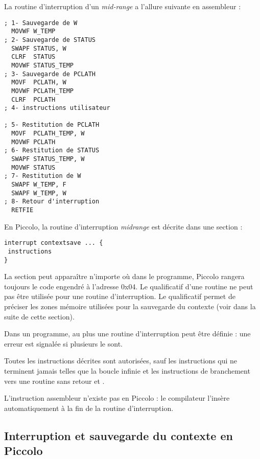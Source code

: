 La routine d'interruption d'un \emph{mid-range} a l'allure suivante en assembleur :

\begin{lstlisting}[language=assembleur]
; 1- Sauvegarde de W
  MOVWF W_TEMP 
; 2- Sauvegarde de STATUS
  SWAPF STATUS, W
  CLRF  STATUS
  MOVWF STATUS_TEMP 
; 3- Sauvegarde de PCLATH
  MOVF  PCLATH, W
  MOVWF PCLATH_TEMP 
  CLRF  PCLATH
; 4- instructions utilisateur

; 5- Restitution de PCLATH
  MOVF  PCLATH_TEMP, W
  MOVWF PCLATH 
; 6- Restitution de STATUS
  SWAPF STATUS_TEMP, W
  MOVWF STATUS
; 7- Restitution de W
  SWAPF W_TEMP, F
  SWAPF W_TEMP, W
; 8- Retour d'interruption
  RETFIE
\end{lstlisting}








En Piccolo, la routine d’interruption \emph{midrange} est décrite dans une section  :

\begin{lstlisting}[language=piccolo]
interrupt contextsave ... {
 instructions
}
\end{lstlisting}

La section  peut apparaître n’importe où dans le programme, Piccolo rangera toujours le code engendré à l’adresse 0x04. Le qualificatif  d’une routine ne peut pas être utilisée pour une routine d’interruption. Le qualificatif  permet de préciser les zones mémoire utilisées pour la sauvegarde du contexte (voir dans la suite de cette section).

Dans un programme, au plus une routine d’interruption peut être définie : une erreur est signalée si plusieurs le sont.

Toutes les instructions décrites sont autorisées, sauf les instructions qui ne terminent jamais telles que la boucle infinie et les instructions de branchement vers une routine sans retour  et .

L’instruction assembleur  n’existe pas en Piccolo : le compilateur l’insère automatiquement à la fin de la routine d’interruption.

\subsection{Interruption et sauvegarde du contexte en Piccolo}

